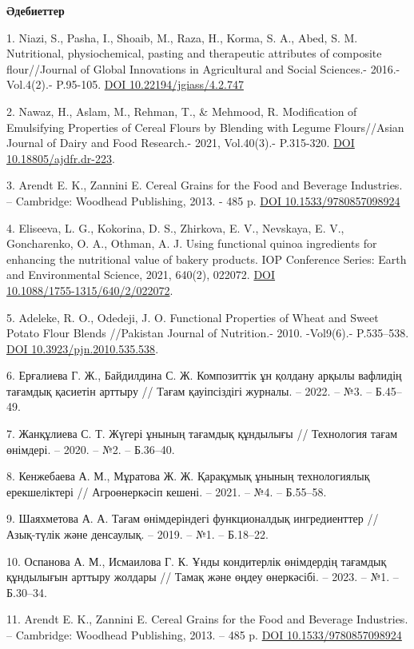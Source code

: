 \begin{center}
{\bfseries Әдебиеттер}
\end{center}

\begin{references}
1. Niazi, S., Pasha, I., Shoaib, M., Raza, H., Korma, S. A., Abed, S. M.
Nutritional, physiochemical, pasting and therapeutic attributes of
composite flour//Journal of Global Innovations in Agricultural and
Social Sciences.- 2016.-Vol.4(2).- P.95-105.
\href{https://doi.org/10.22194/jgiass/4.2.747}{DOI
10.22194/jgiass/4.2.747}

2. Nawaz, H., Aslam, M., Rehman, T., \& Mehmood, R. Modification of
Emulsifying Properties of Cereal Flours by Blending with Legume
Flours//Asian Journal of Dairy and Food Research.- 2021, Vol.40(3).-
P.315-320. \href{https://doi.org/10.18805/ajdfr.dr-223}{DOI
10.18805/ajdfr.dr-223}.

3. Arendt E. K., Zannini E. Cereal Grains for the Food and Beverage
Industries. -- Cambridge: Woodhead Publishing, 2013. - 485 p.
\href{https://doi.org/10.1533/9780857098924}{DOI 10.1533/9780857098924}

4. Eliseeva, L. G., Kokorina, D. S., Zhirkova, E. V., Nevskaya, E. V.,
Goncharenko, O. A., Othman, A. J. Using functional quinoa ingredients
for enhancing the nutritional value of bakery products. IOP Conference
Series: Earth and Environmental Science, 2021, 640(2), 022072.
\href{https://doi.org/10.1088/1755-1315/640/2/022072}{DOI\\
10.1088/1755-1315/640/2/022072}.

5. Adeleke, R. O., Odedeji, J. O. Functional Properties of Wheat and
Sweet Potato Flour Blends //Pakistan Journal of Nutrition.-
2010. -Vol9(6).- P.535--538.
\href{https://doi.org/10.3923/pjn.2010.535.538}{DOI
10.3923/pjn.2010.535.538}.

6. Ерғалиева Г. Ж., Байдилдина С. Ж. Композиттік ұн қолдану арқылы
вафлидің тағамдық қасиетін арттыру // Тағам қауіпсіздігі журналы. --
2022. -- №3. -- Б.45--49.

7. Жанқұлиева С. Т. Жүгері ұнының тағамдық құндылығы // Технология тағам
өнімдері. -- 2020. -- №2. -- Б.36--40.

8. Кенжебаева А. М., Мұратова Ж. Ж. Қарақұмық ұнының технологиялық
ерекшеліктері // Агроөнеркәсіп кешені. -- 2021. -- №4. -- Б.55--58.

9. Шаяхметова А. А. Тағам өнімдеріндегі функционалдық ингредиенттер //
Азық-түлік және денсаулық. -- 2019. -- №1. -- Б.18--22.

10. Оспанова А. М., Исмаилова Г. К. Ұнды кондитерлік өнімдердің тағамдық
құндылығын арттыру жолдары // Тамақ және өңдеу өнеркәсібі. -- 2023. --
№1. -- Б.30--34.

11. Arendt E. K., Zannini E. Cereal Grains for the Food and Beverage
Industries. -- Cambridge: Woodhead Publishing, 2013. -- 485 p.
\href{https://doi.org/10.1533/9780857098924}{DOI 10.1533/9780857098924}
\end{references}

